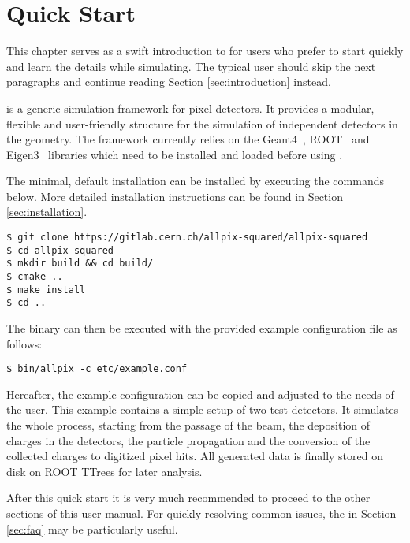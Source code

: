 \section{Quick Start}
This chapter serves as a swift introduction to \apsq for users who prefer to start quickly and learn the details while simulating.
The typical user should skip the next paragraphs and continue reading Section \ref{sec:introduction} instead. 

\apsq is a generic simulation framework for pixel detectors.
It provides a modular, flexible and user-friendly structure for the simulation of independent detectors in the geometry.
The framework currently relies on the Geant4~\cite{geant4}, ROOT~\cite{root} and Eigen3~\cite{eigen3} libraries which need to be installed and loaded before using \apsq.

The minimal, default installation can be installed by executing the commands below.
More detailed installation instructions can be found in Section \ref{sec:installation}.

\begin{verbatim}
$ git clone https://gitlab.cern.ch/allpix-squared/allpix-squared
$ cd allpix-squared
$ mkdir build && cd build/
$ cmake ..
$ make install
$ cd ..
\end{verbatim}
The binary can then be executed with the provided example configuration file as follows:
\begin{verbatim}
$ bin/allpix -c etc/example.conf
\end{verbatim}

Hereafter, the example configuration can be copied and adjusted to the needs of the user.
This example contains a simple setup of two test detectors.
It simulates the whole process, starting from the passage of the beam, the deposition of charges in the detectors, the particle propagation and the conversion of the collected charges to digitized pixel hits.
All generated data is finally stored on disk on ROOT TTrees for later analysis.

After this quick start it is very much recommended to proceed to the other sections of this user manual.
For quickly resolving common issues, the  in Section \ref{sec:faq} may be particularly useful.
